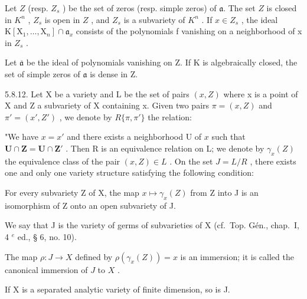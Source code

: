 Let \(Z\) (resp. \(Z_s\) ) be the set of zeros (resp. simple zeros) of \(\mathfrak{a}\). The set \(Z\) is closed in \(K^n\) , \(Z_s\) is open in \(Z\) , and \(Z_s\) is a subvariety of \(K^{n}\) . If \(x \in Z_{s}\) , the ideal \(\mathrm{K}[\mathrm{X}_{1}, \ldots, \mathrm{X}_{n}] \cap \mathfrak{a}_{x}\) consists of the polynomials f vanishing on a neighborhood of x in \(Z_{s}\) .

Let \(\overline{\mathfrak{a}}\) be the ideal of polynomials vanishing on Z. If K is algebraically closed, the set of simple zeros of \(\mathfrak{a}\) is dense in Z.

5.8.12. Let X be a variety and L be the set of pairs \((x, Z)\) where x is a point of X and Z a subvariety of X containing x. Given two pairs \(\pi = (x, Z)\) and \(\pi' = (x', Z')\) , we denote by \(R\{\pi, \pi'\}\) the relation:

"We have \(x = x'\) and there exists a neighborhood U of \(x\) such that \(\mathbf{U} \cap \mathbf{Z} = \mathbf{U} \cap \mathbf{Z'}\) . Then R is an equivalence relation on L; we denote by \(\gamma_x(Z)\) the equivalence class of the pair \((x, Z) \in L\) . On the set \(J = L/R\) , there exists one and only one variety structure satisfying the following condition:

For every subvariety Z of X, the map \(x \mapsto \gamma_{x}(Z)\) from Z into J is an isomorphism of Z onto an open subvariety of J.

We say that J is the variety of germs of subvarieties of X (cf.~Top. Gén., chap.~I, 4 \(^{e}\) ed., § 6, no. 10).

The map \(\rho: J \to X\) defined by \(\rho(\gamma_x(Z)) = x\) is an immersion; it is called the canonical immersion of \(J\) to \(X\) .

If X is a separated analytic variety of finite dimension, so is J.

